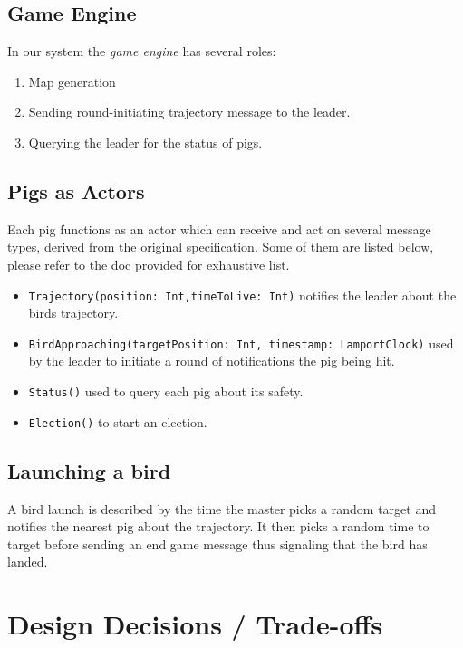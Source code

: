 \documentclass[]{article}
\begin{document}
\subsection{Game Engine}

In our system the \emph{game engine} has several roles:

\begin{enumerate}[1.]
\item
  Map generation
\item
  Sending round-initiating trajectory message to the leader.
\item
  Querying the leader for the status of pigs. 
\end{enumerate}

\subsection{Pigs as Actors}

Each pig functions as an actor which can receive and act on several
message types, derived from the original specification. Some of them are listed below,
please refer to the doc provided for exhaustive list.

\begin{itemize}
\item
  \texttt{Trajectory(position: Int,timeToLive: Int)} notifies the leader about the
  birds trajectory.
\item
  \texttt{BirdApproaching(targetPosition: Int, timestamp: LamportClock)} used by
  the leader to initiate a round of notifications the pig being
  hit.
\item
  \texttt{Status()} used to query each pig about its safety.
\item
  \texttt{Election()} to start an election.
\end{itemize}

\subsection{Launching a bird}

A bird launch is described by the time the master picks a random target
and notifies the nearest pig about the trajectory. It then picks a
random time to target before sending an end game message thus signaling
that the bird has landed.

\section{Design Decisions / Trade-offs}
\end{document}
